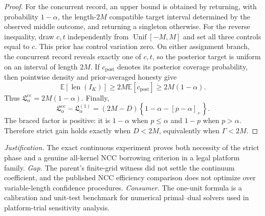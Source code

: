 \documentclass{article}
\begin{document}
\begin{proof}
For the concurrent record, an upper bound is obtained by returning, with probability \(1-\alpha\), the length-\(2M\) compatible target interval determined by the observed middle outcome, and returning a singleton otherwise.  For the reverse inequality, draw \(c,t\) independently from \(\operatorname{Unif}[-M,M]\) and set all three controls equal to \(c\).  This prior has control variation zero.  On either assignment branch, the concurrent record reveals exactly one of \(c,t\), so the posterior target is uniform on an interval of length \(2M\).  If \(c_{\mathrm{post}}\) denotes its posterior coverage probability, then pointwise density and prior-averaged honesty give
\[
 \mathbb E[\operatorname{len}(I_K)]
 \ge2M\mathbb E[c_{\mathrm{post}}]
 \ge2M(1-\alpha).
\]
Thus \(\mathfrak L_\alpha^{\mathrm{cc}}=2M(1-\alpha)\).  Finally,
\[
 \mathfrak L_\alpha^{\mathrm{cc}}-\mathfrak L_\alpha^{(1)}
 =(2M-D)\left\{1-\alpha-[p-\alpha]_+\right\}.
\]
The braced factor is positive: it is \(1-\alpha\) when \(p\le\alpha\) and \(1-p\) when \(p>\alpha\).  Therefore strict gain holds exactly when \(D<2M\), equivalently when \(\Gamma<2M\).
\end{proof}
\par\smallskip\noindent \textit{Justification.} The exact continuous experiment proves both necessity of the strict phase and a genuine all-kernel NCC borrowing criterion in a legal platform family. \textit{Gap.} The parent's finite-grid witness did not settle the continuum coefficient, and the published NCC efficiency comparison does not optimize over variable-length confidence procedures. \textit{Consumer.} The one-unit formula is a calibration and unit-test benchmark for numerical primal--dual solvers used in platform-trial sensitivity analysis.
\end{document}
